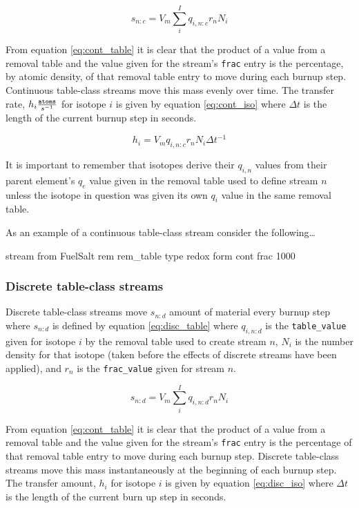 \begin{equation}\label{eq:cont_table}
s_{n:c} = V_{m} \sum_{i}^{I} q_{i,n:c} r_{n} N_{i}
\end{equation}

From equation \ref{eq:cont_table} it is clear that the product of a value from
a removal table and the value given for the stream's \texttt{frac} entry is the
percentage, by atomic density, of that removal table entry to move during 
each burnup step. 
Continuous table-class streams move this mass evenly over time. The transfer
rate, $h_{i} \frac{\text{\texttt{atoms}}}{s^{-1}}$ for isotope $i$ is given by 
equation \ref{eq:cont_iso} where $\Delta t$ is the length of the current burnup 
step in seconds.

\begin{equation}\label{eq:cont_iso}
h_{i} = V_{m} q_{i,n:c} r_{n} N_{i} \Delta t^{-1}
\end{equation}

It is important to remember that isotopes derive their $q_{i,n}$ values from
their parent element's $q_{e}$ value given in the removal table used
to define stream $n$ unless the isotope in question was given its own
$q_{i}$ value in the same removal table.  

As an example of a continuous table-class stream consider the following\ldots

\begin{li}
stream from FuelSalt rem rem_table type redox form cont frac 1000
\end{li}

\subsubsection{Discrete table-class streams}\label{sssec:drem}
Discrete table-class streams move $s_{n:d}$ amount of material every burnup
step where $s_{n:d}$ is defined by equation \ref{eq:disc_table} where
$q_{i,n:d}$ is the \texttt{table\_value} given for isotope $i$ by the removal
table used to create stream $n$, $N_{i}$ is the number density for that isotope 
(taken before the effects of discrete streams have been applied), and $r_{n}$ 
is the \texttt{frac\_value} given for stream $n$.  

\begin{equation}\label{eq:disc_table}
s_{n:d} = V_{m} \sum_{i}^{I} q_{i,n:d} r_{n} N_{i}
\end{equation}

From equation \ref{eq:cont_table} it is clear that the product of a value from
a removal table and the value given for the stream's \texttt{frac} entry is the
percentage of that removal table entry to move during each burnup step. 
Discrete table-class streams move this mass instantaneously at the beginning
of each burnup step. The transfer
amount, $h_{i}$ for isotope $i$ is given 
by equation \ref{eq:disc_iso} where $\Delta t$ is the length of the current burn
up step in seconds.

